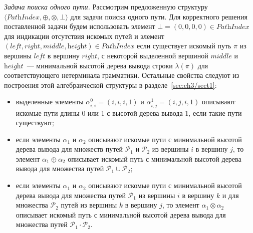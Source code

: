 \textit{Задача поиска одного пути.} Рассмотрим предложенную структуру $\langle \textit{PathIndex}, \oplus, \otimes, \bot \rangle$ для задачи поиска одного пути. Для корректного решения поставленной задачи будем использовать элемент $\bot = (0, 0, 0, 0) \in \textit{PathIndex}$ для индикации отсутствия искомых путей и элемент $(\textit{left}, \textit{right}, \textit{middle}, \textit{height}) \in \textit{PathIndex}$ если существует искомый путь $\pi$ из вершины $\textit{left}$ в вершину $\textit{right}$, с некоторой выделенной вершиной $\textit{middle}$ и $\textit{height}$~--- минимальной высотой дерева вывода строки $\lambda(\pi)$ для соответствующего нетерминала грамматики. Остальные свойства следуют из построения этой алгебраической структуры в разделе~\ref{sec:ch3/sect1}:
\begin{itemize}
        \item выделенные элементы $\alpha^0_{i, i} = (i, i, i, 1)$ и $\alpha^1_{i, j} = (i, j, i, 1)$ описывают искомые пути длины 0 или 1 с высотой дерева вывода 1, если такие пути существуют;
	    \item если элементы $\alpha_1$ и $\alpha_2$ описывают искомые пути с минимальной высотой дерева вывода для множеств путей $\mathcal{P}_1$ и $\mathcal{P}_2$ из вершины $i$ в вершину $j$, то элемент $\alpha_1 \oplus \alpha_2$ описывает искомый путь с минимальной высотой дерева вывода для множества путей $\mathcal{P}_1 \cup \mathcal{P}_2$;
	    \item если элементы $\alpha_1$ и $\alpha_2$ описывают искомые пути с минимальной высотой дерева вывода для множества путей $\mathcal{P}_1$ из вершины $i$ в вершину $k$ и для множества $\mathcal{P}_2$ путей из вершины $k$ в вершину $j$, то элемент $\alpha_1 \otimes \alpha_2$ описывает искомый путь с минимальной высотой дерева вывода для множества путей $\mathcal{P}_1 \cdot \mathcal{P}_2$.
	\end{itemize}

